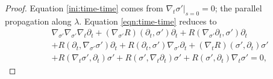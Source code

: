 \documentclass[pdflatex,sn-mathphys-num]{sn-jnl}
\theoremstyle{definition}
\begin{document}
\begin{proof}
Equation \ref{ini:time-time} comes from $\nabla_{t}\sigma'|_{s=0} = 0$; the parallel propagation along $\lambda$. Equation \ref{eqn:time-time} reduces to
\begin{align}
    &\nabla_{\sigma'}\nabla_{\sigma'}\nabla_{t}\partial_{t} + (\nabla_{\sigma'}R)(\partial_{t}, \sigma')\partial_{t} + R(\nabla_{\sigma'}\partial_{t}, \sigma')\partial_{t} \nonumber\\
    &+ R(\partial_{t}, \nabla_{\sigma'}\sigma')\partial_{t} + R(\partial_{t}, \sigma')\nabla_{\sigma'}\partial_{t} + (\nabla_{t}R)(\sigma',\partial_{t})\sigma' \nonumber\\
    &+ R(\nabla_{t}\sigma',\partial_{t})\sigma' + R(\sigma',\nabla_{t}\partial_{t})\sigma' + R(\sigma',\partial_{t})\nabla_{t}\sigma' = 0,
\end{align}

\end{proof}
\end{document}
